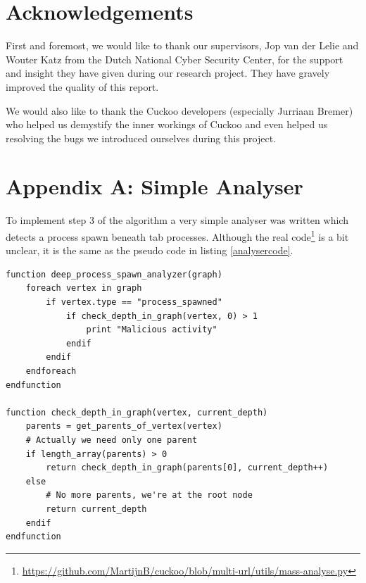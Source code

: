 \documentclass{scrartcl}
\begin{document}
\clearpage

\section*{Acknowledgements}

First and foremost, we would like to thank our supervisors, Jop van der Lelie and Wouter Katz from the Dutch National Cyber Security Center, for the support and insight they have given during our research project. They have gravely improved the quality of this report.

We would also like to thank the Cuckoo developers (especially Jurriaan Bremer) who helped us demystify the inner workings of Cuckoo and even helped us resolving the bugs we introduced ourselves during this project.

\clearpage





\clearpage

\section*{Appendix A: Simple Analyser}

To implement step 3 of the algorithm a very simple analyser was written which detects a process spawn beneath tab processes. Although the real code\footnote{\url{https://github.com/MartijnB/cuckoo/blob/multi-url/utils/mass-analyse.py}} is a bit unclear, it is the same as the pseudo code in listing \ref{analysercode}.

\begin{lstlisting}[caption={Pseudo code for phase 3 of the algorithm},label={analysercode}]
function deep_process_spawn_analyzer(graph)
    foreach vertex in graph
        if vertex.type == "process_spawned"
            if check_depth_in_graph(vertex, 0) > 1
                print "Malicious activity"
            endif
        endif
    endforeach
endfunction

function check_depth_in_graph(vertex, current_depth)
    parents = get_parents_of_vertex(vertex)
    # Actually we need only one parent
    if length_array(parents) > 0
        return check_depth_in_graph(parents[0], current_depth++)
    else
        # No more parents, we're at the root node
        return current_depth
    endif
endfunction
\end{lstlisting}
\end{document}
